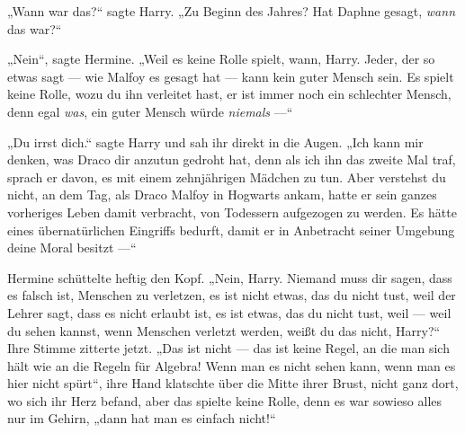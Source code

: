 „Wann war das?“ sagte Harry.
„Zu Beginn des Jahres? Hat Daphne gesagt, \emph{wann} das war?“

„Nein“, sagte Hermine.
„Weil es keine Rolle spielt, wann, Harry. Jeder, der so etwas sagt — wie Malfoy es gesagt hat — kann kein guter Mensch sein. Es spielt keine Rolle, wozu du ihn verleitet hast, er ist immer noch ein schlechter Mensch, denn egal \emph{was}, ein guter Mensch würde \emph{niemals} —“

„Du irrst dich.“ sagte Harry und sah ihr direkt in die Augen.
„Ich kann mir denken, was Draco dir anzutun gedroht hat, denn als ich ihn das zweite Mal traf, sprach er davon, es mit einem zehnjährigen Mädchen zu tun. Aber verstehst du nicht, an dem Tag, als Draco Malfoy in Hogwarts ankam, hatte er sein ganzes vorheriges Leben damit verbracht, von Todessern aufgezogen zu werden. Es hätte eines übernatürlichen Eingriffs bedurft, damit er in Anbetracht seiner Umgebung deine Moral besitzt —“

Hermine schüttelte heftig den Kopf.
„Nein, Harry. Niemand muss dir sagen, dass es falsch ist, Menschen zu verletzen, es ist nicht etwas, das du nicht tust, weil der Lehrer sagt, dass es nicht erlaubt ist, es ist etwas, das du nicht tust, weil — weil du sehen kannst, wenn Menschen verletzt werden, weißt du das nicht, Harry?“
Ihre Stimme zitterte jetzt.
„Das ist nicht — das ist keine Regel, an die man sich hält wie an die Regeln für Algebra! Wenn man es nicht sehen kann, wenn man es hier nicht spürt“, ihre Hand klatschte über die Mitte ihrer Brust, nicht ganz dort, wo sich ihr Herz befand, aber das spielte keine Rolle, denn es war sowieso alles nur im Gehirn, „dann hat man es einfach nicht!“

